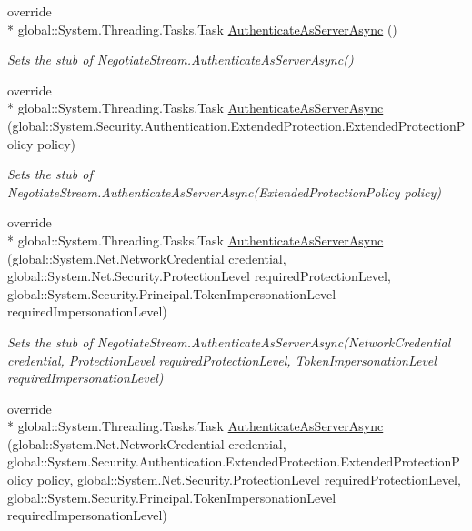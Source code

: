 \begin{DoxyCompactItemize}
override \\*
global\-::\-System.\-Threading.\-Tasks.\-Task \hyperlink{class_system_1_1_net_1_1_security_1_1_fakes_1_1_stub_negotiate_stream_a6f5835d84a6c1606f856e75c404273f7}{Authenticate\-As\-Server\-Async} ()
\begin{DoxyCompactList}\small\item\em Sets the stub of Negotiate\-Stream.\-Authenticate\-As\-Server\-Async()\end{DoxyCompactList}\item 
override \\*
global\-::\-System.\-Threading.\-Tasks.\-Task \hyperlink{class_system_1_1_net_1_1_security_1_1_fakes_1_1_stub_negotiate_stream_aeb368f8a99cb96e8a3a07665b39a1705}{Authenticate\-As\-Server\-Async} (global\-::\-System.\-Security.\-Authentication.\-Extended\-Protection.\-Extended\-Protection\-Policy policy)
\begin{DoxyCompactList}\small\item\em Sets the stub of Negotiate\-Stream.\-Authenticate\-As\-Server\-Async(\-Extended\-Protection\-Policy policy)\end{DoxyCompactList}\item 
override \\*
global\-::\-System.\-Threading.\-Tasks.\-Task \hyperlink{class_system_1_1_net_1_1_security_1_1_fakes_1_1_stub_negotiate_stream_aa8e3f416e735bb8f61c1ea47a17d935b}{Authenticate\-As\-Server\-Async} (global\-::\-System.\-Net.\-Network\-Credential credential, global\-::\-System.\-Net.\-Security.\-Protection\-Level required\-Protection\-Level, global\-::\-System.\-Security.\-Principal.\-Token\-Impersonation\-Level required\-Impersonation\-Level)
\begin{DoxyCompactList}\small\item\em Sets the stub of Negotiate\-Stream.\-Authenticate\-As\-Server\-Async(\-Network\-Credential credential, Protection\-Level required\-Protection\-Level, Token\-Impersonation\-Level required\-Impersonation\-Level)\end{DoxyCompactList}\item 
override \\*
global\-::\-System.\-Threading.\-Tasks.\-Task \hyperlink{class_system_1_1_net_1_1_security_1_1_fakes_1_1_stub_negotiate_stream_a887900aea915ccee9388db1a97749317}{Authenticate\-As\-Server\-Async} (global\-::\-System.\-Net.\-Network\-Credential credential, global\-::\-System.\-Security.\-Authentication.\-Extended\-Protection.\-Extended\-Protection\-Policy policy, global\-::\-System.\-Net.\-Security.\-Protection\-Level required\-Protection\-Level, global\-::\-System.\-Security.\-Principal.\-Token\-Impersonation\-Level required\-Impersonation\-Level)

\end{DoxyCompactItemize}
